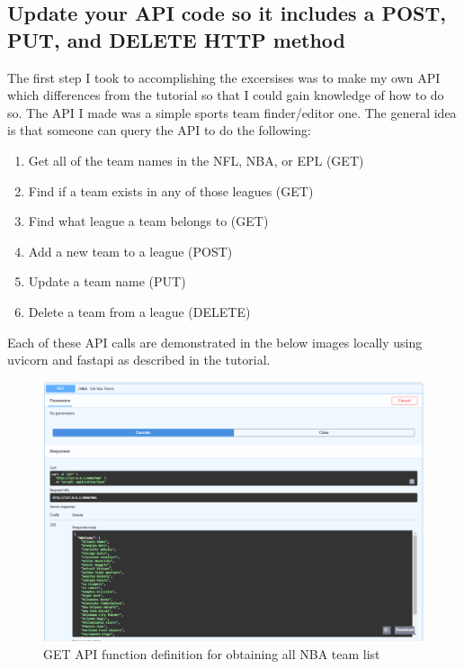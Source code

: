 \documentclass[12pt, letterpaper, final, onecolumn, titlepage] {article}
\begin{document}
\subsection{Update your API code so it includes a POST, PUT, and DELETE HTTP method}

The first step I took to accomplishing the excersises was to make my own API which differences from the tutorial so that I could gain knowledge of how to do so. The API I made was a simple sports team finder/editor one. The general idea is that someone can query the API to do the following:
\begin{enumerate}
	\item Get all of the team names in the NFL, NBA, or EPL (GET)
	\item Find if a team exists in any of those leagues (GET)
	\item Find what league a team belongs to (GET)
	\item Add a new team to a league (POST)
	\item Update a team name (PUT)
	\item Delete a team from a league (DELETE)
\end{enumerate}

Each of these API calls are demonstrated in the below images locally using uvicorn and fastapi as described in the tutorial.
\begin{figure}[htbp]
	\centerline{\includegraphics[scale=.4]{4/Get_NBA.png}}
	\caption{GET API function definition for obtaining all NBA team list }
	\label{getNBA}
\end{figure}
\end{document}
